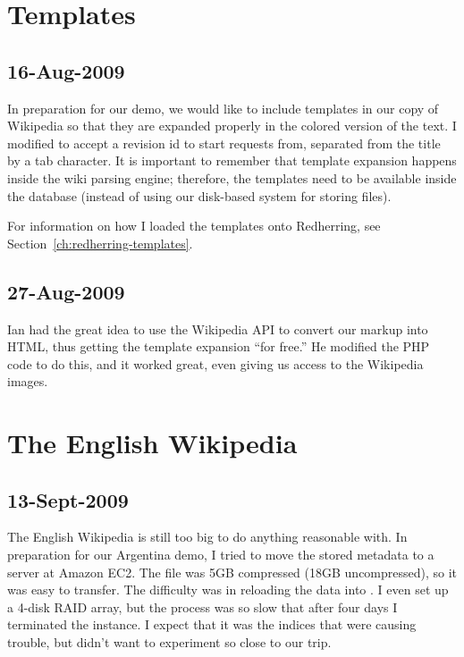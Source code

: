\section{Templates}

\subsection{16-Aug-2009}

In preparation for our demo, we would like to include templates
in our copy of Wikipedia so that they are expanded properly in
the colored version of the text.
I modified  to accept a revision id to start
requests from, separated from the title by a tab character.
It is important to remember that template expansion happens
inside the  wiki parsing engine;
therefore, the templates need to be available inside the
database (instead of using our disk-based system for storing files).

For information on how I loaded the templates onto Redherring,
see Section~\ref{ch:redherring-templates}.

\subsection{27-Aug-2009}

Ian had the great idea to use the Wikipedia API to convert our
markup into HTML, thus getting the template expansion ``for free.''
He modified the PHP code to do this, and it worked great, even
giving us access to the Wikipedia images.

\section{The English Wikipedia}

\subsection{13-Sept-2009}

The English Wikipedia is still too big to do anything reasonable with.
In preparation for our Argentina demo, I tried to move the \mysql
stored metadata to a server at Amazon EC2.
The file was 5GB compressed (18GB uncompressed), so it was easy
to transfer.
The difficulty was in reloading the data into \mysql.
I even set up a 4-disk RAID array, but the process was so slow
that after four days I terminated the instance.
I expect that it was the indices that were causing trouble,
but didn't want to experiment so close to our trip.

